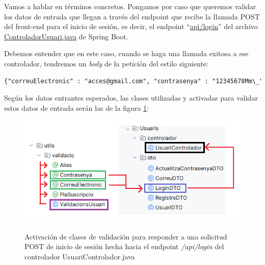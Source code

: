 \documentclass[a4paper,12pt]{report}
\begin{document}
			
			Vamos a hablar en términos concretos. Pongamos por caso que queremos validar los datos de entrada que llegan a través del endpoint que recibe la llamada POST del front-end para el inicio de sesión, es decir, el endpoint ``\href{https://github.com/blackcub3s/mercApp/blob/4ddc34194763af7a246ffabb14146ad9b4b2c5db/APP%20WEB/__springboot__produccio__/app/src/main/java/miApp/app/Usuaris/controlador/UsuariControlador.java#L103}{api/login}'' del archivo \href{https://github.com/blackcub3s/mercApp/blob/main/APP%20WEB/__springboot__produccio__/app/src/main/java/miApp/app/Usuaris/controlador/UsuariControlador.java}{ControladorUsuari.java} de Spring Boot. 
			
			Debemos entender que en este caso, cuando se haga una llamada exitosa a ese controlador, tendremos un \textit{body} de la petición del estilo siguiente:
			
				
			\begin{lstlisting}[language=xml, basicstyle=\ttfamily\footnotesize, keywordstyle=\color{magenta}]
{"correuElectronic" : "acces@gmail.com", "contrasenya" : "12345678Mm\_"}
			\end{lstlisting}
			
	
			

			
			Según los datos entrantes esperados, las clases utilizadas y activadas para validar estos datos de entrada serán las de la figura \ref{fig:validacioBackArxiusDetallLoginVA}:
			
			
			
			\FloatBarrier
			\setlength{\belowcaptionskip}{3pt}
			\begin{figure}[H]
				\centering
				\caption{Activación de clases de validación para responder a una solicitud POST de inicio de sesión hecha hacia el endpoint \textit{/api/login} del controlador UsuariControlador.java}
				\includegraphics[width=1\linewidth]{img/validacioBackArxiusDetallLoginVA}
				\label{fig:validacioBackArxiusDetallLoginVA}
			\end{figure}
			\FloatBarrier
			
\end{document}
